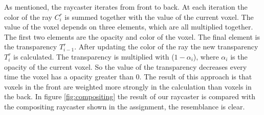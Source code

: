 As mentioned, the raycaster iterates from front to back.
At each iteration the color of the ray $C_{i}^{r}$ is summed together with the value of the current voxel.
The value of the voxel depends on three elements, which are all multiplied together.
The first two elements are the opacity and color of the voxel.
The final element is the transparency $T^{r}_{i-1}$.
After updating the color of the ray the new transparency $T^{r}_{i}$ is calculated.
The transparency is multiplied with ($1 - \alpha_{i}$), where $\alpha_{i}$ is the opacity of the current voxel.
So the value of the transparency decreases every time the voxel has a opacity greater than $0$.
The result of this approach is that voxels in the front are weighted more strongly in the calculation than voxels in the back.
In figure \ref{fig:compositing} the result of our raycaster is compared with the compositing raycaster shown in the assignment, the resemblance is clear.

